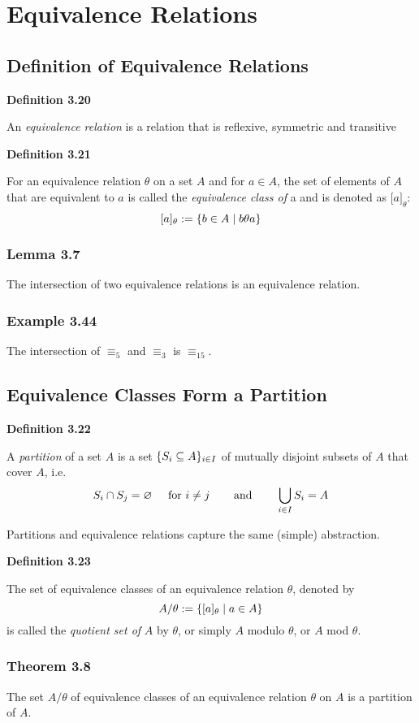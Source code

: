 \documentclass[a4paper]{report}
\newenvironment{definition}[1]{\begin{framed}\centerline{\textbf{Definition #1}}\noindent\hspace{-1.1mm}}{\end{framed}}
\DeclarePairedDelimiter\cur{\{}{\}}
\begin{document}
\section{Equivalence Relations}
\subsection{Definition of Equivalence Relations}
\begin{definition}{3.20}
An \emph{equivalence relation} is a relation that is reflexive, symmetric and transitive 
\end{definition}

\begin{definition}{3.21}
For an equivalence relation $\theta$ on a set $A$ and for $a\in A$, the set of elements of $A$ that are equivalent to $a$ is called the \emph{equivalence class of} a and is denoted as $\lbrack a\rbrack_\theta$: \[\lbrack a\rbrack_\theta:=\cur{b\in A\mid b\theta a}\]
\end{definition}

\subsubsection*{Lemma 3.7}
The intersection of two equivalence relations is an equivalence relation.

\subsubsection*{Example 3.44}
The intersection of $\equiv_5$ and $\equiv_3$ is $\equiv_{15}$.

\subsection{Equivalence Classes Form a Partition}
\begin{definition}{3.22}
A \emph{partition} of a set $A$ is a set $\cur{S_i\subseteq A}_{i\in I}$ of mutually disjoint subsets of $A$ that cover $A$, i.e. \[S_i\cap S_j=\varnothing\hspace{5mm}\text{for }i\not= j\hspace{7.5mm}\text{and}\hspace{7.5mm}\bigcup\limits_{i\in I}S_i=A\]
\end{definition}
Partitions and equivalence relations capture the same (simple) abstraction.

\begin{definition}{3.23}
The set of equivalence classes of an equivalence relation $\theta$, denoted by \[A/\theta:=\cur{\lbrack a\rbrack_\theta\mid a\in A}\] is called the \emph{quotient set of} $A$ by $\theta$, or simply $A$ modulo $\theta$, or $A$ mod $\theta$.
\end{definition}

\subsubsection*{Theorem 3.8}
The set $A/\theta$ of equivalence classes of an equivalence relation $\theta$ on $A$ is a partition of $A$.

\end{document}
